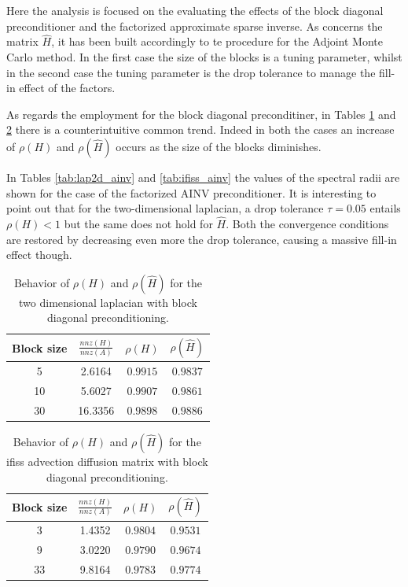 \documentclass[a4paper,10pt]{article}
\begin{document}
Here the analysis is focused on the evaluating the effects of the 
block diagonal preconditioner and the factorized approximate sparse inverse. 
As concerns the matrix $\hat{H}$, it has been built accordingly to te 
procedure for the Adjoint Monte Carlo method. In 
the first case the size of the blocks is a tuning parameter, whilst in the 
second case the tuning parameter is the drop tolerance to manage the fill-in 
effect of the factors. 

As regards the employment for the block diagonal preconditiner, in Tables 
\ref{tab:lap2d_block} and \ref{tab:ifiss_block} there is a counterintuitive 
common trend. Indeed in both the cases an increase of $\rho(H)$ and 
$\rho(\hat{H})$  occurs as the size of the blocks diminishes.

In Tables \ref{tab:lap2d_ainv} and \ref{tab:ifiss_ainv} the values of 
the spectral radii are shown for the case of the factorized AINV 
preconditioner. It is interesting to point out that for the 
two-dimensional 
laplacian, a drop tolerance $\tau=0.05$ entails $\rho(H)<1$ but the same does 
not hold for $\hat{H}$. Both the convergence conditions are restored by 
decreasing even more the drop tolerance, causing a massive fill-in effect 
though.


\begin{table}[!h]
\centering
\begin{tabular}{|c|c|c|c|}
\hline
\textbf{Block size} & \textbf{$\frac{nnz(H)}{nnz(A)}$}& $\rho(H)$ 
&$\rho(\hat{H})$\\
\hline
 5 & 2.6164 & $0.9915$ & $0.9837$\\
\hline 
 10 & 5.6027 & $0.9907$ & $0.9861$\\
\hline
 30 & 16.3356 & $0.9898$  & $0.9886$\\
\hline
\end{tabular}
\caption{Behavior of $\rho(H)$ and $\rho(\hat{H})$ for the two dimensional 
laplacian with block diagonal preconditioning.} 
\label{tab:lap2d_block}
\end{table}


\begin{table}[!h]
\centering
\begin{tabular}{|c|c|c|c|}
\hline
\textbf{Block size} & \textbf{$\frac{nnz(H)}{nnz(A)}$}& $\rho(H)$ 
&$\rho(\hat{H})$\\
\hline
 3 & 1.4352 & $0.9804$ & $0.9531$\\
\hline 
 9 & 3.0220 & $0.9790$ & $0.9674$\\
\hline
 33 & 9.8164 & $0.9783$  & $0.9774$\\
\hline
\end{tabular}
\caption{Behavior of $\rho(H)$ and $\rho(\hat{H})$ for the ifiss advection 
diffusion matrix with block diagonal preconditioning.} 
\label{tab:ifiss_block}
\end{table}
\end{document}
